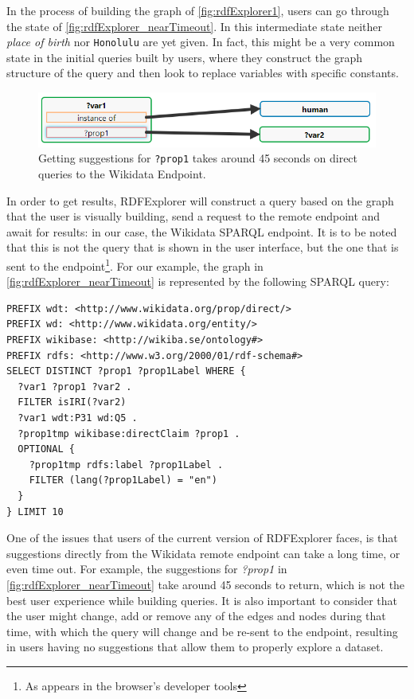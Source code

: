 In the process of building the graph of \autoref{fig:rdfExplorer1}, users can go through the state of \autoref{fig:rdfExplorer_nearTimeout}. 
In this intermediate state neither \textit{place of birth} nor \texttt{Honolulu} are yet given. 
In fact, this might be a very common state in the initial queries built by users, where they construct the graph structure of the query and then look to replace variables with specific constants. 

\begin{figure}[h]
    \centering
        \includegraphics[width=0.8\linewidth]{imagenes/near timeout query.png}
        \caption{Getting suggestions for \texttt{?prop1} takes around 45 seconds on direct queries to the Wikidata Endpoint.}
        \label{fig:rdfExplorer_nearTimeout}
\end{figure}

In order to get results, RDFExplorer will construct a query based on the graph that the user is visually building, send a request to the remote endpoint and await for results: in our case, the Wikidata SPARQL endpoint. 
It is to be noted that this is not the query that is shown in the user interface, but the one that is sent to the endpoint\footnote{As appears in the browser's developer tools}. 
For our example, the graph in \autoref{fig:rdfExplorer_nearTimeout} is represented by the following SPARQL query:

\begin{verbatim}
PREFIX wdt: <http://www.wikidata.org/prop/direct/>
PREFIX wd: <http://www.wikidata.org/entity/>
PREFIX wikibase: <http://wikiba.se/ontology#>
PREFIX rdfs: <http://www.w3.org/2000/01/rdf-schema#>
SELECT DISTINCT ?prop1 ?prop1Label WHERE {
  ?var1 ?prop1 ?var2 .
  FILTER isIRI(?var2)
  ?var1 wdt:P31 wd:Q5 .
  ?prop1tmp wikibase:directClaim ?prop1 .
  OPTIONAL {
    ?prop1tmp rdfs:label ?prop1Label .
    FILTER (lang(?prop1Label) = "en")
  }
} LIMIT 10
\end{verbatim}

One of the issues that users of the current version of RDFExplorer faces, is that suggestions directly from the Wikidata remote endpoint can take a long time, or even time out. For example, the suggestions for \textit{?prop1} in \autoref{fig:rdfExplorer_nearTimeout} take around 45 seconds to return, which is not the best user experience while building queries. It is also important to consider that the user might change, add or remove any of the edges and nodes during that time, with which the query will change and be re-sent to the endpoint, resulting in users having no suggestions that allow them to properly explore a dataset. 


